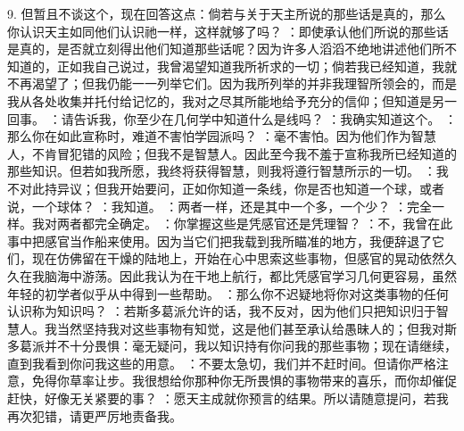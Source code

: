 9. 但暂且不谈这个，现在回答这点：倘若与关于天主所说的那些话是真的，那么你认识天主如同他们认识祂一样，这样就够了吗？\newline{} ：即使承认他们所说的那些话是真的，是否就立刻得出他们知道那些话呢？因为许多人滔滔不绝地讲述他们所不知道的，正如我自己说过，我曾渴望知道我所祈求的一切；倘若我已经知道，我就不再渴望了；但我仍能一一列举它们。因为我所列举的并非我理智所领会的，而是我从各处收集并托付给记忆的，我对之尽其所能地给予充分的信仰；但知道是另一回事。\newline{} ：请告诉我，你至少在几何学中知道什么是线吗？\newline{} ：我确实知道这个。\newline{} ：那么你在如此宣称时，难道不害怕学园派吗？\newline{} ：毫不害怕。因为他们作为智慧人，不肯冒犯错的风险；但我不是智慧人。因此至今我不羞于宣称我所已经知道的那些知识。但若如我所愿，我终将获得智慧，则我将遵行智慧所示的一切。\newline{} ：我不对此持异议；但我开始要问，正如你知道一条线，你是否也知道一个球，或者说，一个球体？\newline{} ：我知道。\newline{} ：两者一样，还是其中一个多，一个少？\newline{} ：完全一样。我对两者都完全确定。\newline{} ：你掌握这些是凭感官还是凭理智？\newline{} ：不，我曾在此事中把感官当作船来使用。因为当它们把我载到我所瞄准的地方，我便辞退了它们，现在仿佛留在干燥的陆地上，开始在心中思索这些事物，但感官的晃动依然久久在我脑海中游荡。因此我认为在干地上航行，都比凭感官学习几何更容易，虽然年轻的初学者似乎从中得到一些帮助。\newline{} ：那么你不迟疑地将你对这类事物的任何认识称为知识吗？\newline{} ：若斯多葛派允许的话，我不反对，因为他们只把知识归于智慧人。我当然坚持我对这些事物有知觉，这是他们甚至承认给愚昧人的；但我对斯多葛派并不十分畏惧：毫无疑问，我以知识持有你问我的那些事物；现在请继续，直到我看到你问我这些的用意。\newline{} ：不要太急切，我们并不赶时间。但请你严格注意，免得你草率让步。我很想给你那种你无所畏惧的事物带来的喜乐，而你却催促赶快，好像无关紧要的事？\newline{} ：愿天主成就你预言的结果。所以请随意提问，若我再次犯错，请更严厉地责备我。\par

